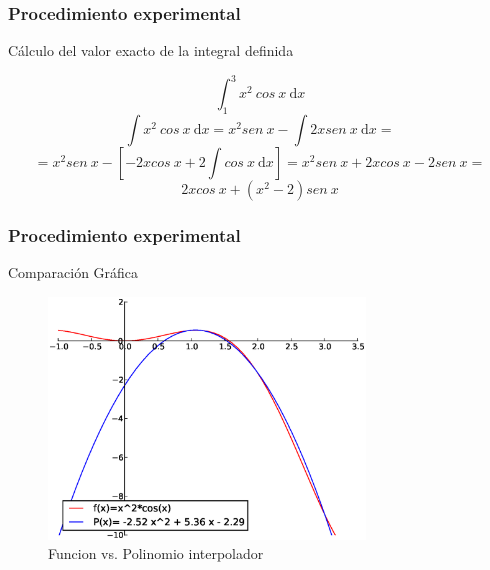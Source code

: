 \documentclass{beamer}
\begin{document}
\begin{frame}
\frametitle{Procedimiento experimental}
  \begin{block}{Cálculo del valor exacto de la integral definida}

  \[ \int_{1}^{3} x^2\ cos\ x\ \text{d}x \]
  \[ \int x^2\ cos\ x\ \text{d}x = x^2 sen\ x - \int 2x sen\ x\ \text{d}x = \]
  \[ = x^2 sen\ x - \left[-2x cos\ x + 2\int cos\ x\ \text{d}x \right] = 
  x^2 sen\ x +2x cos\ x - 2sen\ x = \]
  \[ 2x cos\ x + (x^2 -2)sen\ x \]

  \end{block}
\end{frame}

\begin{frame}
\frametitle{Procedimiento experimental}
  \begin{block}{Comparación Gráfica}

  \begin{figure}[h]
    \begin{center}
      \includegraphics[width=0.75\textwidth]{img/grafica2.eps}
      \caption{Funcion vs. Polinomio interpolador}
      \label{grafica2}
    \end{center}
  \end{figure}
  \end{block}
 
\end{frame}
\end{document}
